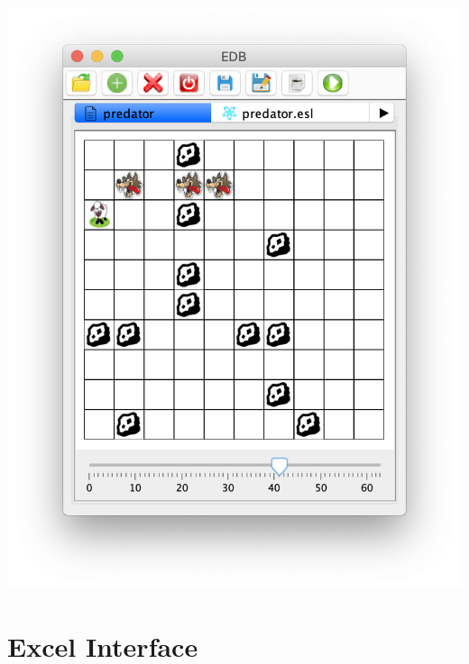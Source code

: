 \documentclass[5p,times]{elsarticle}
\begin{document}
\begin{center}
\includegraphics[width=\columnwidth]{pred4}
\end{center}

\section{Excel Interface}

\label{sec:excel}
\end{document}
